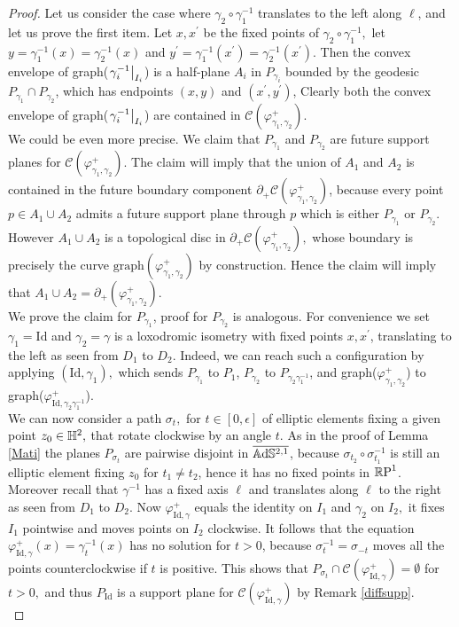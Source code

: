  \begin{proof}
     Let us consider the case where $\gamma_2\circ\gamma_1^{-1}$ translates to the left along $\ell$, and let us prove the first item. Let $x,x^{\prime}$ be the fixed points of $\gamma_2\circ\gamma_1^{-1},$ let $y=\gamma_1^{-1}(x)=\gamma_2^{-1}(x)$ and $y^{\prime}=\gamma_1^{-1}(x^{\prime})=\gamma_2^{-1}(x^{\prime})$. Then the convex envelope of graph($\restr{\gamma_i^{-1}}{I_i}$) is a half-plane $A_i$ in $P_{\gamma_i}$ bounded by the geodesic $P_{\gamma_1}\cap P_{\gamma_2}$, which has endpoints $(x,y)$ and $(x^{\prime} ,y^{\prime})$, Clearly both the convex envelope of graph($\restr{\gamma_i^{-1}}{I_i}$) are contained in $\mathcal{C}(\varphi_{\gamma_1,\gamma_2}^{+}).$\\
     We could be even more precise. We claim that $P_{\gamma_1}$ and $P_{\gamma_2}$ are future support planes for $\mathcal{C}(\varphi_{\gamma_1,\gamma_2}^{+})$. The claim will imply that the union of $A_1$ and $A_2$ is contained in the future boundary component $\partial_+\mathcal{C}(\varphi_{\gamma_1,\gamma_2}^{+})$, because every point $p\in A_1\cup A_2$ admits a future support plane through $p$ which is either $P_{\gamma_1}$ or $P_{\gamma_2}$. However $A_1\cup A_2$ is a topological disc in $\partial_+\mathcal{C}(\varphi_{\gamma_1,\gamma_2}^{+}),$ whose boundary is precisely the curve $\text{graph}(\varphi_{\gamma_1,\gamma_2}^{+})$ by construction. Hence the claim will imply that $A_1\cup A_2=\partial_+(\varphi_{\gamma_1,\gamma_2}^{+}).$\\
     We prove the claim for $P_{\gamma_1}$, proof for $P_{\gamma_2}$ is analogous. For convenience we set $\gamma_1=\text{Id}$ and $\gamma_2=\gamma$ is a loxodromic isometry with fixed points $x,x^{\prime}$, translating to the left as seen from $D_1$ to $D_2$. Indeed, we can reach such a configuration by applying $(\text{Id},\gamma_1),$ which sends $P_{\gamma_1}$ to $P_1$, $P_{\gamma_2}$ to $P_{\gamma_2\gamma_1^{-1}}$, and graph($\varphi_{\gamma_1,\gamma_2}^+$) to graph($\varphi_{\text{Id},\gamma_2\gamma_1^{-1}}^+$). \\
     We can now consider a path $\sigma_t,$ for $t\in[0,\epsilon]$ of elliptic elements fixing a given point $z_0\in\H^2,$ that rotate clockwise by an angle $t.$ As in the proof of Lemma \ref{Mati} the planes $P_{\sigma_t}$ are pairwise disjoint in $\overline{\A^{2,1}}$, because $\sigma_{t_2}\circ\sigma_{t_1}^{-1}$ is still an elliptic element fixing $z_0$ for $t_1\neq t_2$, hence it has no fixed points in $\S$. Moreover recall that $\gamma^{-1}$ has a fixed axis $\ell$ and translates along $\ell$ to the right as seen from $D_1$ to $D_2$. Now $\varphi_{\text{Id},\gamma}^+$ equals the identity on $I_1$ and $\gamma_2$ on $I_2,$ it fixes $I_1$ pointwise and moves points on $I_2$ clockwise. It follows that the equation $\varphi_{\text{Id},\gamma}^+(x)=\gamma_t^{-1}(x)$ has no solution for $t>0$, because $\sigma_{t}^{-1}=\sigma_{-t}$ moves all the points counterclockwise if $t$ is positive. This shows that $P_{\sigma_t}\cap\mathcal{C}(\varphi^+_{\text{Id},\gamma})=\emptyset$ for $t>0,$ and thus $P_{\text{Id}}$ is a support plane for $\mathcal{C}(\varphi^+_{\text{Id},\gamma})$ by Remark \ref{diffsupp}.\\

\end{proof}
